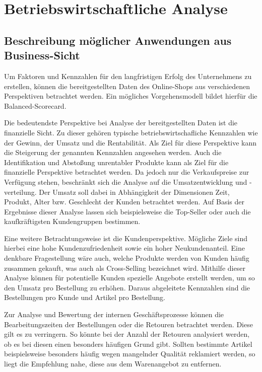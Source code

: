 \section{Betriebswirtschaftliche Analyse}
\subsection{Beschreibung möglicher Anwendungen aus Business-Sicht}

Um Faktoren und Kennzahlen für den langfristigen Erfolg des Unternehmens zu erstellen, können die bereitgestellten Daten des Online-Shops aus verschiedenen Perspektiven betrachtet werden. Ein mögliches Vorgehensmodell bildet hierfür die Balanced-Scorecard.

Die bedeutendste Perspektive bei Analyse der bereitgestellten Daten ist die finanzielle Sicht. Zu dieser gehören typische betriebswirtschafliche Kennzahlen wie der Gewinn, der Umsatz und die Rentabilität. Als Ziel für diese Perspektive kann die Steigerung der genannten Kennzahlen angesehen werden. Auch die Identifikation und Abstoßung unrentabler Produkte kann als Ziel für die finanzielle Perspektive betrachtet werden. Da jedoch nur die Verkaufspreise zur Verfügung stehen, beschränkt sich die Analyse auf die Umsatzentwicklung und -verteilung. Der Umsatz soll dabei in Abhängigkeit der Dimensionen Zeit, Produkt, Alter bzw. Geschlecht der Kunden betrachtet werden. Auf Basis der Ergebnisse dieser Analyse lassen sich beispielsweise die Top-Seller oder auch die kaufkräftigsten Kundengruppen bestimmen.

Eine weitere Betrachtungsweise ist die Kundenperspektive. Mögliche Ziele sind hierbei eine hohe Kundenzufriedenheit sowie ein hoher Neukundenanteil. Eine denkbare Fragestellung wäre auch, welche Produkte werden von Kunden häufig zusammen gekauft, was auch als Cross-Selling bezeichnet wird. Mithilfe dieser Analyse können für potentielle Kunden spezielle Angebote erstellt werden, um so den Umsatz pro Bestellung zu erhöhen. Daraus abgeleitete Kennzahlen sind die Bestellungen pro Kunde und Artikel pro Bestellung.

Zur Analyse und Bewertung der internen Geschäftsprozesse können die Bearbeitungszeiten der Bestellungen oder die Retouren betrachtet werden. Diese gilt es zu verringern.
So könnte bei der Anzahl der Retouren analysiert werden, ob es bei diesen einen besonders häufigen Grund gibt. Sollten bestimmte Artikel beispielsweise besonders häufig wegen mangelnder Qualität reklamiert werden, so liegt die Empfehlung nahe, diese aus dem Warenangebot zu entfernen.

